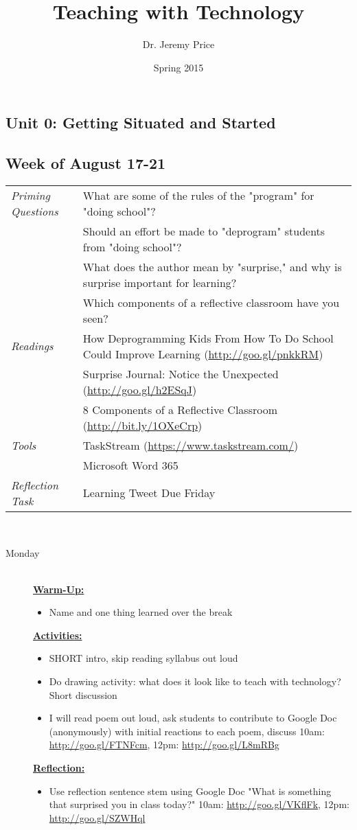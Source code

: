 \documentclass{tufte-handout}
\title{Teaching with Technology}
\author{Dr. Jeremy Price}
\date{Spring 2015}  %
\newcommand{\tabpq}{\faQuestionCircle\medspace\textit{Priming Questions}}
\newcommand{\tabread}{\faBook\medspace\textit{Readings}}
\newcommand{\tabtools}{\faWrench\medspace\textit{Tools}}
\newcommand{\tabtweet}{\faLightbulbO\medspace\textit{Reflection Task} & Learning Tweet Due Friday \\}
\newenvironment{tabsched}
	{\small
	\begin{tabular}{p{1.5in}p{4.5in}}
	\toprule}
	{\bottomrule
	\end{tabular}
	\normalsize\\}
\newcommand{\weekone}{August 17-21}
\newcommand{\listmon}{\item[Monday] \hfill \\}
\newenvironment{daywu}
	{\textbf{\underline{Warm-Up:}} \hfill \\
	\begin{itemize}}
	{\end{itemize}}
\newenvironment{dayact}
	{\textbf{\underline{Activities:}} \hfill \\
	\begin{itemize}}
	{\end{itemize}}
\newenvironment{dayref}
	{\textbf{\underline{Reflection:}} \hfill \\
	\begin{itemize}}
	{\end{itemize}}
\newenvironment{weeksched}
	{\noindent
	\begin{description}}
	{\end{description}
	\newpage}
\begin{document}
\begin{fullwidth}

\section{Unit 0: Getting Situated and Started}

\subsection{Week of \weekone}

\begin{tabsched}
	\tabpq & What are some of the rules of the "program" for "doing school"? \\
	& Should an effort be made to "deprogram" students from "doing school"? \\
	& What does the author mean by "surprise," and why is surprise important for learning? \\
	& Which components of a reflective classroom have you seen? \\
	\midrule
	\tabread & How Deprogramming Kids From How To Do School Could Improve Learning (\url{http://goo.gl/pnkkRM}) \\
	& Surprise Journal: Notice the Unexpected (\url{http://goo.gl/h2ESqJ}) \\
	& 8 Components of a Reflective Classroom (\url{http://bit.ly/1OXeCrp}) \\
	\midrule
	\tabtools & TaskStream (\url{https://www.taskstream.com/}) \\
	& Microsoft Word 365 \\
	\midrule
	\tabtweet
\end{tabsched}
\begin{weeksched}

\listmon
\begin{daywu}
	\item Name and one thing learned over the break
\end{daywu}
\begin{dayact}
	\item SHORT intro, skip reading syllabus out loud
	\item Do drawing activity: what does it look like to teach with technology? Short discussion
	\item I will read poem out loud, ask students to contribute to Google Doc (anonymously) with initial reactions to each poem, discuss 10am: \url{http://goo.gl/FTNFcm}, 12pm: \url{http://goo.gl/L8mRBg}
\end{dayact}
\begin{dayref}
	\item Use reflection sentence stem using Google Doc "What is something that surprised you in class today?" 10am: \url{http://goo.gl/VKflFk}, 12pm: \url{http://goo.gl/SZWHql}
\end{dayref}


\end{weeksched}
\end{fullwidth}
\end{document}
